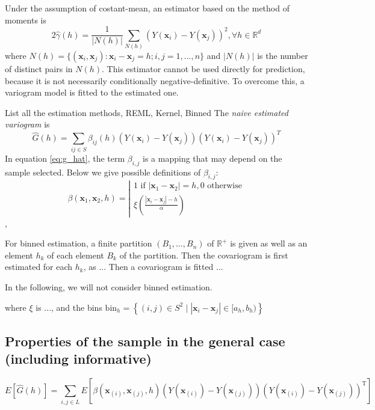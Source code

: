 \documentclass[12pt]{article}
\theoremstyle{definition}
\theoremstyle{remark}
\newcommand{\paramnuisance}{\xi}
\newcommand{\Sample}{S}
\newcommand{\position}{\mathbf{x}}
\newcommand{\Sampleindex}{L}
\newcommand{\Signal}{Y}
\begin{document}
Under the assumption of costant-mean, an estimator based on the method of moments is 
\begin{equation} \label{eq:variogram_hat}
2\hat{\gamma}\left(h\right)=\frac{1}{|N\left(h\right)|}\sum_{N\left(h\right)}{\left(\Signal\left(\position_{i}\right)-\Signal\left(\position_{j}\right)\right)^{2}},\forall h\in\mathbb{R}^{d}
\end{equation}
where $N\left(h\right)=\lbrace\left(\position_{i},\position_{j}\right):\position_{i}-\position_{j}=h;i,j=1,...,n\rbrace$ and $|N\left(h\right)|$ is the number of distinct pairs in $N\left(h\right)$. This estimator cannot be used directly for prediction, because it is not necessarily conditionally negative-definitive. To overcome this, a variogram model is fitted to the estimated one. 

List all the estimation methods, REML, Kernel, Binned
The \emph{naive estimated variogram} is 
\begin{equation} \label{eq:g_hat}
    \hat{G}(h)=\sum_{ij\in\Sample}{\beta_{ij}(h)(\Signal(\position_{i})-\Signal(\position_{j}))(\Signal(\position_{i})-Y(\position_{j}))^{T}}
\end{equation}
In equation \eqref{eq:g_hat}, the term $\beta_{i,j}$ is a mapping that may depend on the sample selected.
Below we give possible definitions of $\beta_{i,j}$:
\begin{equation}
    \beta(\position_1,\position_2,h)=
    \left|\begin{array}{l}
    1 \text{ if } |\position_1-\position_2|=h, 0 \text{ otherwise}\\
    \paramnuisance(\frac{|\position_{i}-\position_{j}|-h}{\alpha})
    \end{array}\right.
\end{equation},

For binned estimation, a finite partition $(B_1,\ldots,B_n)$ of $\mathbb{R}^+$ is given as well as an element $h_k$ of each element $B_k$ of the partition. 
Then the covariogram is first estimated for each $h_k$, as 
...
Then a covariogram is fitted 
...

In the following, we will not consider binned estimation.


where {\color{red} $\paramnuisance$ is ..., and the bins $\mathrm{bin}_h=\left\{(i,j)\in\Sample^2\mid \left|\position_i-\position_j\right|\in [a_h,b_h)\right\}$}

\subsection{Properties of the sample in the general case (including informative)}
\begin{equation}
    E[\hat{G}(h)]=\sum_{i,j\in\Sampleindex}E\left[ \beta(\position_{(i)},\position_{(j)},h)(\Signal(\position_{(i)})-\Signal(\position_{(j)}))(\Signal(\position_{(i)})-\Signal(\position_{(j)}))^{\mathrm{T}}\right]
\end{equation}
\end{document}

